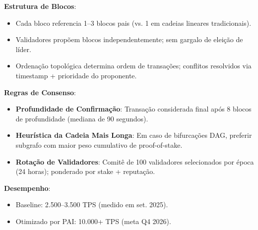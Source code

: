 \documentclass[11pt]{article}
\begin{document}
\begin{itemize}[noitemsep]
\begin{itemize}[noitemsep]
\begin{itemize}[noitemsep]
\textbf{Estrutura de Blocos}:
\begin{itemize}[noitemsep]
  \item Cada bloco referencia 1--3 blocos pais (vs. 1 em cadeias lineares tradicionais).
  \item Validadores propõem blocos independentemente; sem gargalo de eleição de líder.
  \item Ordenação topológica determina ordem de transações; conflitos resolvidos via timestamp + prioridade do proponente.
\end{itemize}

\textbf{Regras de Consenso}:
\begin{itemize}[noitemsep]
  \item \textbf{Profundidade de Confirmação}: Transação considerada final após 8 blocos de profundidade (mediana de 90 segundos).
  \item \textbf{Heurística da Cadeia Mais Longa}: Em caso de bifurcações DAG, preferir subgrafo com maior peso cumulativo de proof-of-stake.
  \item \textbf{Rotação de Validadores}: Comitê de 100 validadores selecionados por época (24 horas); ponderado por stake + reputação.
\end{itemize}

\textbf{Desempenho}:
\begin{itemize}[noitemsep]
  \item Baseline: 2.500--3.500 TPS (medido em set. 2025).
  \item Otimizado por PAI: 10.000+ TPS (meta Q4 2026).
\end{itemize}


\end{itemize}
\end{itemize}
\end{itemize}
\end{document}

